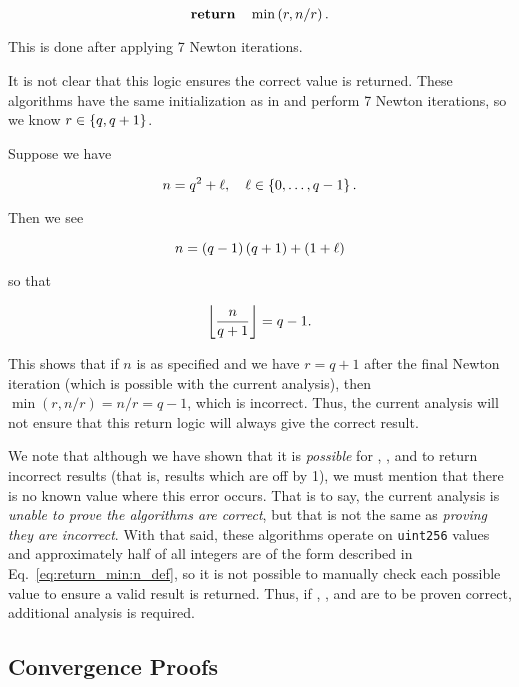 \begin{equation}
    \Return \quad\min\parens{r, n/r}.
\end{equation}

\noindent
This is done after applying 7 Newton iterations.

It is not clear that this logic ensures the correct value is returned.
These algorithms have the same initialization
as in \UnrolledOne{} and perform 7 Newton iterations, so we know
$r\in\left\{ q, q+1 \right\}$.

Suppose we have

\begin{equation}
    n = q^{2} + \ell, \quad\ell\in\left\{ 0,\dots,q-1 \right\}.
    \label{eq:return_min:n_def}
\end{equation}

\noindent
Then we see

\begin{equation}
    n = \left( q-1 \right)\left( q+1 \right) + \left( 1+\ell \right)
\end{equation}

\noindent
so that

\begin{equation}
    \left\lfloor \frac{n}{q+1} \right\rfloor = q-1.
\end{equation}

\noindent
This shows that if $n$ is as specified and we have $r=q+1$
after the final Newton iteration (which is possible with the current analysis),
then $\min(r, n/r) = n/r = q-1$, which is incorrect.
Thus, the current analysis will not ensure that this return logic
will always give the correct result.

We note that although we have shown that it is \emph{possible} for
\prb{}, \OpenZeppelin{}, and \abdk{}
to return incorrect results (that is, results which are off by 1),
we must mention that there is no known value where this error occurs.
That is to say, the current analysis is \emph{unable to prove
the algorithms are correct},
but that is not the same as \emph{proving they are incorrect}.
With that said, these algorithms operate on \texttt{uint256}
values and approximately half of all integers are of the form described
in Eq.~\eqref{eq:return_min:n_def},
so it is not possible to manually check each possible value
to ensure a valid result is returned.
Thus, if \prb{}, \OpenZeppelin{}, and \abdk{} are to be proven correct,
additional analysis is required.

\subsection{Convergence Proofs}

